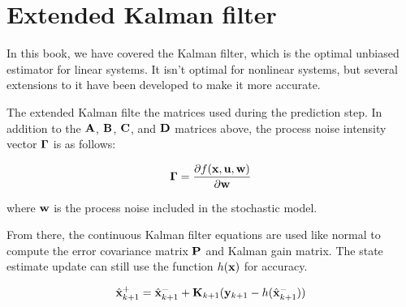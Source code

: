 \section{Extended Kalman filter}

In this book, we have covered the Kalman filter, which is the optimal unbiased
estimator for linear \glspl{system}. It isn't optimal for nonlinear
\glspl{system}, but several extensions to it have been developed to make it more
accurate.

The extended Kalman filte  the matrices used
during the prediction step. In addition to the $\mathbf{A}$, $\mathbf{B}$, $\mathbf{C}$,
and $\mathbf{D}$ matrices above, the process noise intensity vector $\mathbf{\Gamma}$
is  as follows:

\begin{equation*}
  \mathbf{\Gamma} = \frac{\partial f(\mathbf{x}, \mathbf{u}, \mathbf{w})}{\partial \mathbf{w}}
\end{equation*}

where $\mathbf{w}$ is the process noise included in the stochastic model.

From there, the continuous Kalman filter equations are used like normal to
compute the error covariance matrix $\mathbf{P}$ and Kalman gain matrix. The
\gls{state} estimate update can still use the function $h(\mathbf{x})$ for
accuracy.

\begin{equation*}
  \hat{\mathbf{x}}_{k+1}^+ = \hat{\mathbf{x}}_{k+1}^- +
    \mathbf{K}_{k+1}(\mathbf{y}_{k+1} - h(\hat{\mathbf{x}}_{k+1}^-))
\end{equation*}
